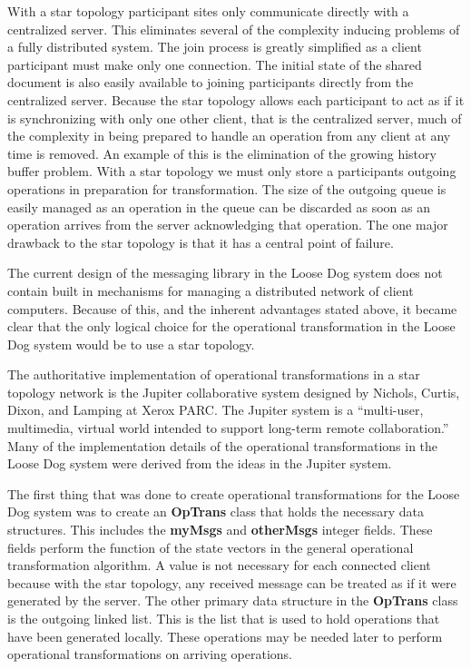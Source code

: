 \documentclass{article}
\begin{document}
With a star topology participant sites only communicate directly with
a centralized server.  This eliminates several of the complexity
inducing problems of a fully distributed system.  The join process is
greatly simplified as a client participant must make only one
connection.  The initial state of the shared document is also easily
available to joining participants directly from the centralized server.
Because the star topology allows each participant to act as if it is
synchronizing with only one other client, that is the centralized
server, much of the complexity in being prepared to handle an
operation from any client at any time is removed.  An example of this
is the elimination of the growing history buffer problem.  With a star
topology we must only store a participants outgoing operations in
preparation for transformation.  The size of the outgoing queue is
easily managed as an operation in the queue can be discarded as soon
as an operation arrives from the server acknowledging that operation.
The one major drawback to the star topology is that it has a central
point of failure.

The current design of the messaging library in the Loose Dog system
does not contain built in mechanisms for managing a distributed
network of client computers.  Because of this, and the inherent
advantages stated above, it became clear that the only logical choice
for the operational transformation in the Loose Dog system would be to
use a star topology.

The authoritative implementation of operational transformations in a
star topology network is the Jupiter collaborative system designed by
Nichols, Curtis, Dixon, and Lamping at Xerox PARC.  The Jupiter system
is a ``multi-user, multimedia, virtual world intended to support
long-term remote collaboration.''  Many of the implementation details
of the operational transformations in the Loose Dog system were
derived from the ideas in the Jupiter system.

The first thing that was done to create operational transformations
for the Loose Dog system was to create an \textbf{OpTrans} class that
holds the necessary data structures.  This includes the
\textbf{myMsgs} and \textbf{otherMsgs} integer fields.  These fields
perform the function of the state vectors in the general operational
transformation algorithm.  A value is not necessary for each connected
client because with the star topology, any received message can be
treated as if it were generated by the server.  The other primary data
structure in the \textbf{OpTrans} class is the outgoing linked list.
This is the list that is used to hold operations that have been
generated locally.  These operations may be needed later to perform
operational transformations on arriving operations.
\end{document}

